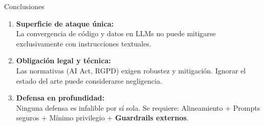 \documentclass[aspectratio=169, 11pt]{beamer}
\begin{document}
\begin{frame}{Conclusiones}
    
    \begin{enumerate}
        \item \textbf{Superficie de ataque única:}\\
        La convergencia de código y datos en LLMs no puede mitigarse exclusivamente con instrucciones textuales.
        
        \vspace{0.4cm}
        \item \textbf{Obligación legal y técnica:}\\
        Las normativas (AI Act, RGPD) exigen robustez y mitigación. Ignorar el estado del arte puede considerarse negligencia.
        
        \vspace{0.4cm}
        \item \textbf{Defensa en profundidad:}\\
        Ninguna defensa es infalible por sí sola. Se requiere: Alineamiento + Prompts seguros + Mínimo privilegio + \textbf{Guardrails externos}.
    \end{enumerate}
    
\end{frame}
\end{document}
